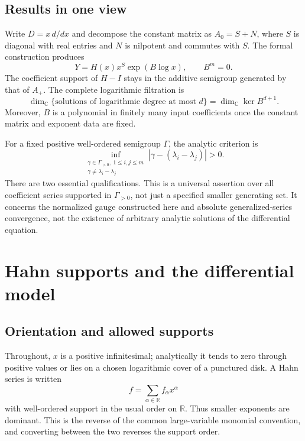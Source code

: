 \documentclass[11pt,a4paper]{article}
\numberwithin{equation}{section}
\theoremstyle{definition}
\theoremstyle{remark}
\newcommand{\C}{\mathbb C}
\newcommand{\R}{\mathbb R}
\newcommand{\G}{\Gamma}
\newcommand{\abs}[1]{\left\lvert #1\right\rvert}
\newcommand{\Aplus}{A_{+}}
\begin{document}
\subsection{Results in one view}
Write $D=x\,d/dx$ and decompose the constant matrix as $A_0=S+N$, where
$S$ is diagonal with real entries and $N$ is nilpotent and commutes with
$S$. The formal construction produces
\begin{equation}\label{eq:intro-solution}
 Y=H(x)x^S\exp(B\log x),\qquad B^m=0.
\end{equation}
The coefficient support of $H-I$ stays in the additive semigroup generated
by that of $\Aplus$. The complete logarithmic filtration is
\begin{equation}\label{eq:intro-filtration}
 \dim_\C\{\text{solutions of logarithmic degree at most }d\}
   =\dim_\C\ker B^{d+1}.
\end{equation}
Moreover, $B$ is a polynomial in finitely many input coefficients once the
constant matrix and exponent data are fixed.

For a fixed positive well-ordered semigroup $\G$, the analytic criterion is
\begin{equation}\label{eq:intro-gap}
 \inf_{\substack{\gamma\in\G_{>0},\ 1\leq i,j\leq m\\
                  \gamma\ne\lambda_i-\lambda_j}}
       \abs{\gamma-(\lambda_i-\lambda_j)}>0.
\end{equation}
There are two essential qualifications. This is a universal assertion over
all coefficient series supported in $\G_{>0}$, not just a specified smaller
generating set. It concerns the normalized gauge constructed here and
absolute generalized-series convergence, not the existence of arbitrary
analytic solutions of the differential equation.

\section{Hahn supports and the differential model}
\label{sec:support}

\subsection{Orientation and allowed supports}
Throughout, $x$ is a positive infinitesimal; analytically it tends to zero
through positive values or lies on a chosen logarithmic cover of a punctured
disk. A Hahn series is written
\[
 f=\sum_{\alpha\in\R}f_\alpha x^\alpha
\]
with well-ordered support in the usual order on $\R$. Thus smaller
exponents are dominant. This is the reverse of the common large-variable
monomial convention, and converting between the two reverses the support
order.
\end{document}
